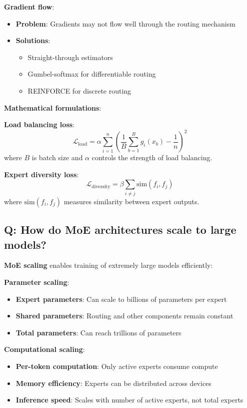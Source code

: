 \textbf{Gradient flow}:
\begin{itemize}
	\item \textbf{Problem}: Gradients may not flow well through the routing mechanism
	\item \textbf{Solutions}:
	      \begin{itemize}
		      \item Straight-through estimators
		      \item Gumbel-softmax for differentiable routing
		      \item REINFORCE for discrete routing
	      \end{itemize}
\end{itemize}

\textbf{Mathematical formulations}:

\textbf{Load balancing loss}:
\[
	\mathcal{L}_{\text{load}} = \alpha \sum_{i=1}^{n} \left(\frac{1}{B} \sum_{b=1}^{B} g_i(x_b) - \frac{1}{n}\right)^2
\]
where \(B\) is batch size and \(\alpha\) controls the strength of load balancing.

\textbf{Expert diversity loss}:
\[
	\mathcal{L}_{\text{diversity}} = \beta \sum_{i \neq j} \text{sim}(f_i, f_j)
\]
where \(\text{sim}(f_i, f_j)\) measures similarity between expert outputs.

\subsection*{Q: How do MoE architectures scale to large models?}
\textbf{MoE scaling} enables training of extremely large models efficiently:

\textbf{Parameter scaling}:
\begin{itemize}
	\item \textbf{Expert parameters}: Can scale to billions of parameters per expert
	\item \textbf{Shared parameters}: Routing and other components remain constant
	\item \textbf{Total parameters}: Can reach trillions of parameters
\end{itemize}

\textbf{Computational scaling}:
\begin{itemize}
	\item \textbf{Per-token computation}: Only active experts consume compute
	\item \textbf{Memory efficiency}: Experts can be distributed across devices
	\item \textbf{Inference speed}: Scales with number of active experts, not total experts
\end{itemize}

